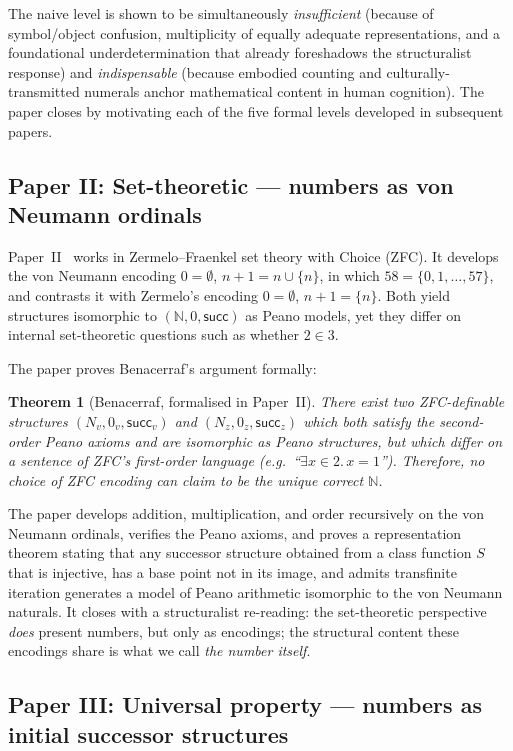 \documentclass[12pt]{article}
\newtheorem{theorem}{Theorem}[section]
\theoremstyle{definition}
\theoremstyle{remark}
\newcommand{\N}{\mathbb{N}}
\newcommand{\suc}{\mathsf{succ}}
\begin{document}
The naive level is shown to be simultaneously \emph{insufficient} (because
of symbol/object confusion, multiplicity of equally adequate
representations, and a foundational underdetermination that already
foreshadows the structuralist response) and \emph{indispensable} (because
embodied counting and culturally-transmitted numerals anchor mathematical
content in human cognition). The paper closes by motivating each of the
five formal levels developed in subsequent papers.

\subsection{Paper II: Set-theoretic --- numbers as von Neumann ordinals}
\label{sec:row-ii}

Paper~II~\cite{paper-ii} works in Zermelo--Fraenkel set theory with Choice
(ZFC). It develops the von Neumann encoding $0 = \emptyset$,
$n + 1 = n \cup \{n\}$, in which $58 = \{0, 1, \ldots, 57\}$, and contrasts
it with Zermelo's encoding $0 = \emptyset$, $n + 1 = \{n\}$. Both yield
structures isomorphic to $(\N, 0, \suc)$ as Peano models, yet they differ
on internal set-theoretic questions such as whether $2 \in 3$.

The paper proves Benacerraf's argument formally:

\begin{theorem}[Benacerraf, formalised in Paper~II]
\label{thm:benacerraf}
There exist two ZFC-definable structures $(N_v, 0_v, \suc_v)$ and
$(N_z, 0_z, \suc_z)$ which both satisfy the second-order Peano axioms and
are isomorphic as Peano structures, but which differ on a sentence of
ZFC's first-order language (e.g.\ ``$\exists x \in 2.\, x = 1$'').
Therefore, no choice of ZFC encoding can claim to be the unique correct
$\N$.
\end{theorem}

The paper develops addition, multiplication, and order recursively on the
von Neumann ordinals, verifies the Peano axioms, and proves a representation
theorem stating that any successor structure obtained from a class function
$S$ that is injective, has a base point not in its image, and admits
transfinite iteration generates a model of Peano arithmetic isomorphic to
the von Neumann naturals. It closes with a structuralist re-reading: the
set-theoretic perspective \emph{does} present numbers, but only as
encodings; the structural content these encodings share is what we call
\emph{the number itself}.

\subsection{Paper III: Universal property --- numbers as initial successor structures}
\label{sec:row-iii}
\end{document}
